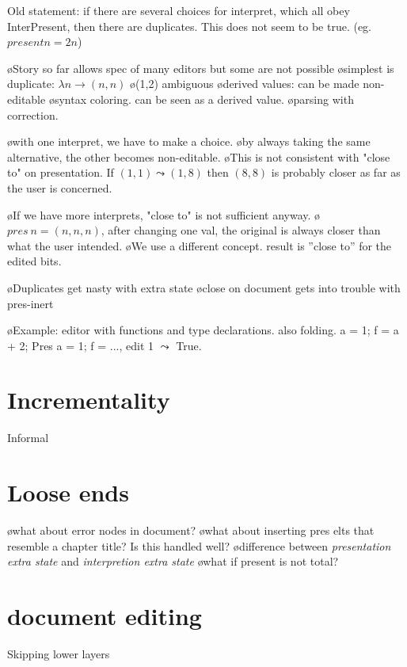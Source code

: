 Old statement: if there are several choices for interpret, which all obey {\sc InterPresent}, then there are duplicates. This does not seem to be true. (eg. $present n = 2n$)


\bl
\o Story so far allows spec of many editors but some are not possible
\o simplest is duplicate: $\lambda n \to (n,n)$
\o (1,2) ambiguous
\o derived values: can be made non-editable
\o syntax coloring. can be seen as a derived value.
\o parsing with correction. 
\el

\bl
\o with one interpret, we have to make a choice.
\o by always taking the same alternative, the other becomes non-editable.
\o This is not consistent with "close to" on presentation.  If $(1,1) \leadsto (1,8)$ then $(8,8)$ is probably closer as far as the user is concerned.
\el

\bl
\o If we have more interprets, "close to" is not sufficient anyway.
\o $pres~n = (n,n,n)$, after changing one val, the original is always closer than what the user intended.
\o We use a different concept. result is ''close to'' for the edited bits.
\el

\bl
\o Duplicates get nasty with extra state
\o close on document gets into trouble with pres-inert
\el

\bl
\o Example: editor with functions and type declarations. also folding. a = 1; f = a + 2; Pres a = 1; f = ..., edit 1 $\leadsto$ True. 
\el


%																
%																
%																
\section{Incrementality}
Informal


%																
%																
%																
\section{Loose ends}
\bl
\o what about error nodes in document?
\o what about inserting pres elts that resemble a chapter title? Is this handled well?
\o difference between {\em presentation extra state} and {\em interpretion extra state}
\o what if present is not total?
\el


%																
%																
%																
\section{document editing}
Skipping lower layers

